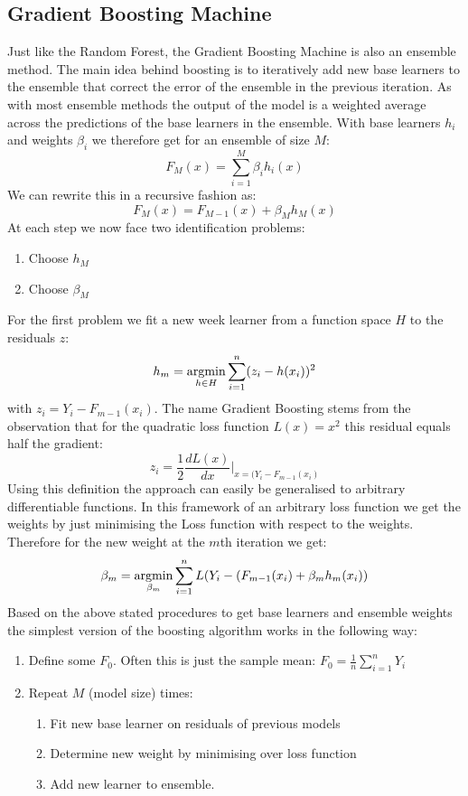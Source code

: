 \subsection{Gradient Boosting Machine}
Just like the Random Forest, the Gradient Boosting Machine is also an ensemble method. The main idea behind boosting is to iteratively add new base learners to the ensemble that correct the error of the ensemble in the previous iteration. As with most ensemble methods the output of the model is a weighted average across the predictions of the base learners in the ensemble. With base learners $h_i$ and weights $\beta_i$ we therefore get for an ensemble of size $M$:
$$F_M(x) = \sum_{i = 1}^M \beta_i h_i(x)$$ 
We can rewrite this in a recursive fashion as:
$$F_M(x) = F_{M-1}(x) + \beta_M h_M(x)$$
At each step we now face two identification problems:
\begin{enumerate}
\item Choose $h_M$
\item Choose $\beta_M$
\end{enumerate}
For the first problem we fit a new week learner from a function space $H$ to the residuals $z$:
$$h_m = \operatorname*{argmin}_{h \in H} \sum_{i = 1}^n (z_i - h(x_i))^2$$
with $z_i = Y_i - F_{m-1}(x_i)$. The name Gradient Boosting stems from the observation that for the quadratic loss function $L(x) = x^2$ this residual equals half the gradient:
$$z_i = \frac{1}{2}\frac{dL(x)}{dx}|_{x = (Y_i - F_{m-1}(x_i)}$$
Using this definition the approach can easily be generalised to arbitrary differentiable functions. 
In this framework of an arbitrary loss function we get the weights by just minimising the Loss function with respect to the weights. Therefore for the new weight at the $m$th iteration we get:
$$\beta_m = \operatorname*{argmin}_{\beta_m} \sum_{i = 1}^n L(Y_i - (F_{m-1}(x_i) + \beta_m h_m(x_i))$$
Based on the above stated procedures to get base learners and ensemble weights the simplest version of the boosting algorithm works in the following way:
\begin{enumerate}
\item Define some $F_0$. Often this is just the sample mean: $F_0 = \frac{1}{n}\sum_{i=1}^n Y_i$
\item Repeat $M$ (model size) times:
\begin{enumerate}
\item Fit new base learner on residuals of previous models
\item Determine new weight by minimising over loss function
\item Add new learner to ensemble.
\end{enumerate}
\end{enumerate}

